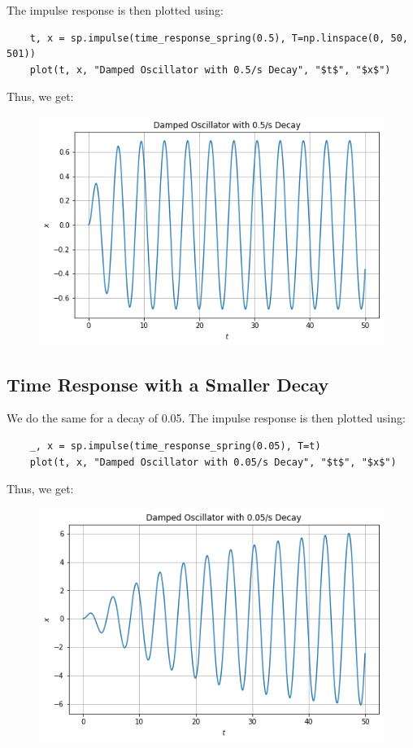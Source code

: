 \documentclass[12pt, a4paper]{article}
\begin{document}
The impulse response is then plotted using:
\begin{lstlisting}
    t, x = sp.impulse(time_response_spring(0.5), T=np.linspace(0, 50, 501))
    plot(t, x, "Damped Oscillator with 0.5/s Decay", "$t$", "$x$")
\end{lstlisting}

Thus, we get:
\begin{figure}[H]
    \centering
    \includegraphics[scale=0.6]{1.png}
\end{figure}


\subsection{Time Response with a Smaller Decay}
We do the same for a decay of 0.05. The impulse response is then plotted using:
\begin{lstlisting}
    _, x = sp.impulse(time_response_spring(0.05), T=t)
    plot(t, x, "Damped Oscillator with 0.05/s Decay", "$t$", "$x$")
\end{lstlisting}

Thus, we get:
\begin{figure}[H]
    \centering
    \includegraphics[scale=0.6]{2.png}
\end{figure}
\end{document}
